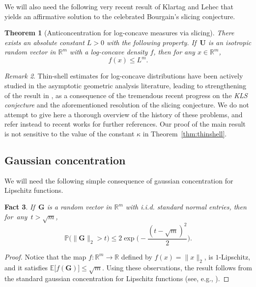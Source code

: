 \documentclass[11pt,leqno]{amsart}
\newtheorem{theorem}{Theorem}[section]
\newtheorem{fact}[theorem]{Fact}
\theoremstyle{remark}
\newtheorem{remark}[theorem]{Remark}
\theoremstyle{plain}
\begin{document}
We will also need the following very recent result of Klartag and Lehec \cite{KL24b} that yields an affirmative solution to the celebrated Bourgain's slicing conjecture.

\begin{theorem}[Anticoncentration for log-concave measures via slicing] \label{thm:slicing}
There exists an absolute constant $L>0$ with the following property. If\, $\mathbf{U}$ is an isotropic random vector in $\mathbb{R}^m$ with a log-concave density $f$, then for any $x \in \mathbb{R}^m$,
\begin{equation} \label{eq2.3}
f(x) \leqslant L^{m}.
\end{equation}
\end{theorem}

\begin{remark}
Thin-shell estimates for log-concave distributions have been actively studied in the asymptotic geometric analysis literature, leading to strengthening of the result in \cite{Kl07}, as a consequence of the tremendous recent progress on the {\it KLS conjecture} and the aforementioned resolution of the slicing conjecture. We do not attempt to give here a thorough overview of the history of these problems, and refer instead to recent works \cite{Bi25, Ch21, KL24a, Gu24, KL24b} for further references. Our proof of the main result is not sensitive to the value of the constant $\kappa$ in Theorem~\ref{thm:thinshell}.
\end{remark}

\subsection{Gaussian concentration}

We will need the following simple consequence of gaussian concentration for Lipschitz functions.
\begin{fact}\label{cor:gaussian_tails}
If\, $\mathbf{G}$ is a random vector in $\mathbb{R}^m$ with i.i.d. standard normal entries, then for~any~$t>\sqrt{m}$,
\begin{equation} \label{eq2.4}
\mathbb{P}\big( \|\mathbf{G}\|_2>t \big) \leqslant 2\exp \Big( -\frac{(t-\sqrt{m})^2}{2} \Big).
\end{equation}
\end{fact}
\begin{proof}
Notice that the map $f\colon \mathbb{R}^m\to \mathbb{R}$ defined by $f(x) = \|x\|_2$, is $1$-Lipschitz, and it satisfies $\mathbb{E}\big[f(\mathbf{G})\big] \leqslant \sqrt{m}$. Using these observations, the result follows from the standard gaussian concentration for Lipschitz functions (see, e.g., \cite[Sections 1.1--1.2]{Le01}).
\end{proof}
\end{document}
